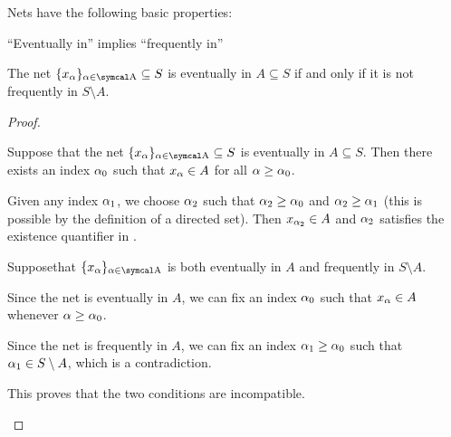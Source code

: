 \begin{proposition}\label{thm:topological_net_properties}
  Nets have the following basic properties:

  \begin{propenum}
     \enquote{Eventually in} implies \enquote{frequently in}

     The net \( \{ x_\al \}_{\al \in \CA} \subseteq S \) is eventually in \( A \subseteq S \) if and only if it is not frequently in \( S \setminus A \).
  \end{propenum}
\end{proposition}
\begin{proof}\mbox{}
  \begin{description}
     Suppose that the net \( \{ x_\al \}_{\al \in \CA} \subseteq S \) is eventually in \( A \subseteq S \). Then there exists an index \( \alpha_0 \) such that \( x_\alpha \in A \) for all \( \alpha \geq \alpha_0 \).

    Given any index \( \alpha_1 \), we choose \( \alpha_2 \) such that \( \alpha_2 \geq \alpha_0 \) and \( \alpha_2 \geq \alpha_1 \) (this is possible by the definition of a directed set). Then \( x_{\alpha_2} \in A \) and \( \alpha_2 \) satisfies the existence quantifier in .

     Suppose\LEM that \( \{ x_\al \}_{\al \in \CA} \) is both eventually in \( A \) and frequently in \( S \setminus A \).

    Since the net is eventually in \( A \), we can fix an index \( \alpha_0 \) such that \( x_\alpha \in A \) whenever \( \alpha \geq \alpha_0 \).

    Since the net is frequently in \( A \), we can fix an index \( \alpha_1 \geq \alpha_0 \) such that \( \alpha_1 \in S \setminus A \), which is a contradiction.

    This proves that the two conditions are incompatible.
  \end{description}
\end{proof}

